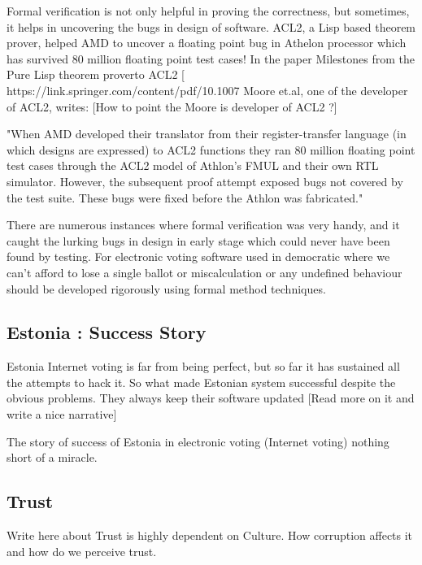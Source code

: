 	Formal verification is not only helpful in proving the correctness, 
	but sometimes, it helps in uncovering the bugs in design of
	software. ACL2, a Lisp based theorem prover, helped 
	AMD to uncover a floating point bug in Athelon processor which 
	has survived 80 million floating point test cases! 
	In the paper Milestones from the Pure Lisp theorem proverto ACL2 [
	https://link.springer.com/content/pdf/10.1007%
	Moore et.al, one of the developer of ACL2, writes:
	[How to point the Moore is developer of ACL2 ?]
	
	"When AMD developed their translator 
	from their register-transfer language (in which designs
	are expressed) to ACL2 functions they ran 80 million 
	floating point test cases through the ACL2 model of 
	Athlon’s FMUL and their own RTL simulator. However, the 
	subsequent proof attempt exposed bugs not covered by the
	test suite. These bugs were fixed before the Athlon was 
	fabricated."
	
	There are numerous instances where formal verification 
	was very handy, and it caught the lurking bugs in design in early 
	stage which could never have been found by testing. For 
	electronic voting software used in democratic where we 
	can't afford to lose a single ballot or miscalculation 
	or any undefined behaviour should be developed 
	rigorously using formal method techniques.   	
		
   
   \subsection{Estonia : Success Story}
	Estonia Internet voting is far from being perfect, but so far 
	it has sustained all the attempts to hack it. So what made 
	Estonian system successful despite the obvious problems. 
	They always keep their software updated [Read more on it and
	write a nice narrative]
	
	The story of success of Estonia in electronic voting (Internet
	voting) nothing short of a miracle. 

   \subsection{Trust}
    
    Write here about Trust is highly dependent on Culture. How
    corruption affects it and how do we perceive trust.    
   
